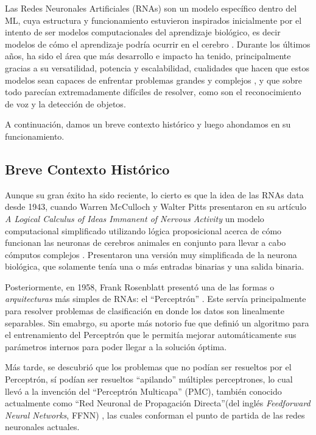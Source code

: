 \documentclass[../../main.tex]{subfiles}
\begin{document}
Las Redes Neuronales Artificiales (RNAs) son un modelo específico dentro del ML, cuya
estructura y funcionamiento estuvieron inspirados inicialmente por el intento de ser
modelos computacionales del aprendizaje biológico, es decir modelos de cómo el aprendizaje
podría ocurrir en el cerebro \cite{deep-learning}. Durante los últimos años, ha sido el
área que más desarrollo e impacto ha tenido, principalmente gracias a su versatilidad,
potencia y escalabilidad, cualidades que hacen que estos modelos sean capaces de
enfrentar problemas grandes y complejos \cite{hands-on-ML-sklearn-tf}, y que sobre todo
parecían extremadamente difíciles de resolver, como son el reconocimiento de voz y la
detección de objetos.

A continuación, damos un breve contexto histórico y luego ahondamos en su funcionamiento.

\subsection{Breve Contexto Histórico}
Aunque su gran éxito ha sido reciente, lo cierto es que la idea de las RNAs data desde
1943, cuando Warren McCulloch y Walter Pitts presentaron en su artículo \textit{A Logical
Calculus of Ideas Immanent of Nervous Activity} \cite{mculloch-pitts-1943} un modelo
computacional simplificado utilizando lógica proposicional acerca de cómo funcionan las
neuronas de cerebros animales en conjunto para llevar a cabo cómputos complejos
\cite{hands-on-ML-sklearn-tf}. Presentaron una versión muy simplificada de la neurona
biológica, que solamente tenía una o más entradas binarias y una salida binaria.

Posteriormente, en 1958, Frank Rosenblatt presentó una de las formas o
\textit{arquitecturas} más simples de RNAs: el ``Perceptrón''
\cite{rosenblatt1958perceptron}. Este servía principalmente para resolver problemas de
clasificación en donde los datos son linealmente separables. Sin emabrgo, su aporte más
notorio fue que definió un algoritmo para el entrenamiento del Perceptrón que le permitía
mejorar automáticamente sus parámetros internos para poder llegar a la solución óptima.

Más tarde, se descubrió que los problemas que no podían ser resueltos por el Perceptrón,
sí podían ser resueltos ``apilando'' múltiples perceptrones, lo cual llevó a la invención
del ``Perceptrón Multicapa'' (PMC), también conocido actualmente como ``Red Neuronal de
Propagación Directa''\footnotemark (del inglés \textit{Feedforward Neural Networks}, FFNN)
\cite{deep-learning}, las cuales conforman el punto de partida de las redes neuronales
actuales. 
\end{document}
